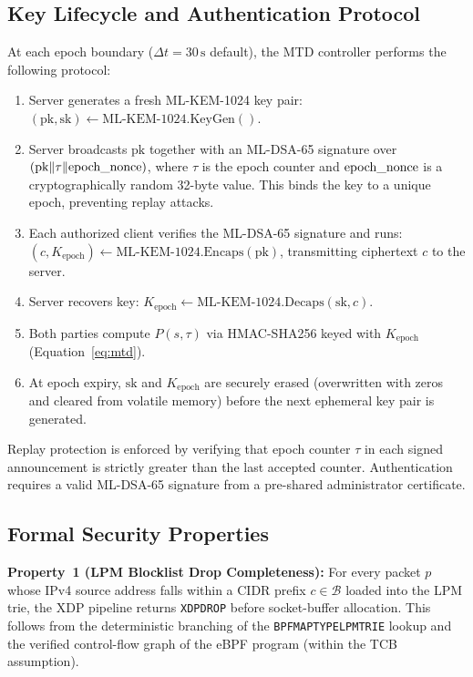 \documentclass[journal]{IEEEtran}
\renewcommand{\_}{\textunderscore\allowbreak}
\begin{document}
\subsection{Key Lifecycle and Authentication Protocol}
At each epoch boundary ($\Delta t = 30\,\text{s}$ default), the MTD controller
performs the following protocol:
\begin{enumerate}
  \item Server generates a fresh ML-KEM-1024 key pair:
    $(\text{pk}, \text{sk}) \leftarrow \text{ML-KEM-1024.KeyGen}()$.

  \item Server broadcasts $\text{pk}$ together with an ML-DSA-65 signature over
    $(\text{pk} \| \tau \| \text{epoch\_nonce})$, where $\tau$ is the epoch counter
    and $\text{epoch\_nonce}$ is a cryptographically random 32-byte value. This
    binds the key to a unique epoch, preventing replay attacks.

  \item Each authorized client verifies the ML-DSA-65 signature and runs:
    $(c, K_{\text{epoch}}) \leftarrow \text{ML-KEM-1024}.\allowbreak\text{Encaps}(\text{pk})$,
    transmitting ciphertext $c$ to the server.

  \item Server recovers key:
    $K_{\text{epoch}} \leftarrow \text{ML-KEM-1024}.\allowbreak\text{Decaps}(\text{sk}, c)$.

  \item Both parties compute $P(s, \tau)$ via HMAC-SHA256 keyed with
    $K_{\text{epoch}}$ (Equation~\ref{eq:mtd}).

  \item At epoch expiry, $\text{sk}$ and $K_{\text{epoch}}$ are securely erased
    (overwritten with zeros and cleared from volatile memory) before the next
    ephemeral key pair is generated.
\end{enumerate}
Replay protection is enforced by verifying that epoch counter $\tau$ in each
signed announcement is strictly greater than the last accepted counter.
Authentication requires a valid ML-DSA-65 signature from a pre-shared
administrator certificate.

\subsection{Formal Security Properties}

\textbf{Property~1 (LPM Blocklist Drop Completeness):}
For every packet $p$ whose IPv4 source address falls within a CIDR prefix
$c \in \mathcal{B}$ loaded into the LPM trie, the XDP pipeline returns
\texttt{XDP\_DROP} before socket-buffer allocation. This follows from the
deterministic branching of the \texttt{BPF\_MAP\_TYPE\_LPM\_TRIE} lookup and the
verified control-flow graph of the eBPF program (within the TCB assumption).
\end{document}
